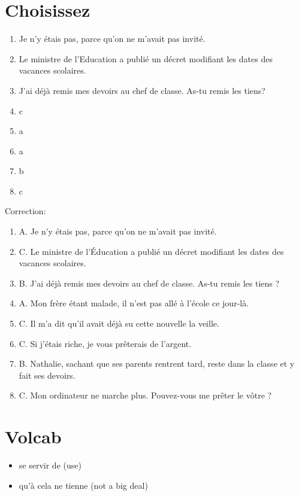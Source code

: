 \documentclass{book}
\begin{document}
    \section{Choisissez}
        \begin{enumerate}
            \item Je n'y étais pas, parce qu'on ne m'avait pas invité.
            \item Le ministre de l'Education a publié un décret modifiant les dates des vacances scolaires.
            \item J'ai déjà remis mes devoirs au chef de classe. As-tu remis les tiens?
            \item c
            \item a
            \item a
            \item b
            \item c
        \end{enumerate}
        Correction:
        \begin{enumerate}
            \item A. Je n'y étais pas, parce qu'on ne m'avait pas invité.
            \item C. Le ministre de l'Éducation a publié un décret modifiant les dates des vacances scolaires.
            \item B. J'ai déjà remis mes devoirs au chef de classe. As-tu remis les tiens ?
            \item A. Mon frère étant malade, il n'est pas allé à l'école ce jour-là.
            \item C. Il m'a dit qu'il avait déjà su cette nouvelle la veille.
            \item C. Si j'étais riche, je vous prêterais de l'argent.
            \item B. Nathalie, sachant que ses parents rentrent tard, reste dans la classe et y fait ses devoirs.
            \item C. Mon ordinateur ne marche plus. Pouvez-vous me prêter le vôtre ?
        \end{enumerate}

    \section{Volcab}
        \begin{itemize}
            \item se servir de (use)
            \item qu'à cela ne tienne (not a big deal)
        \end{itemize}
\end{document}
